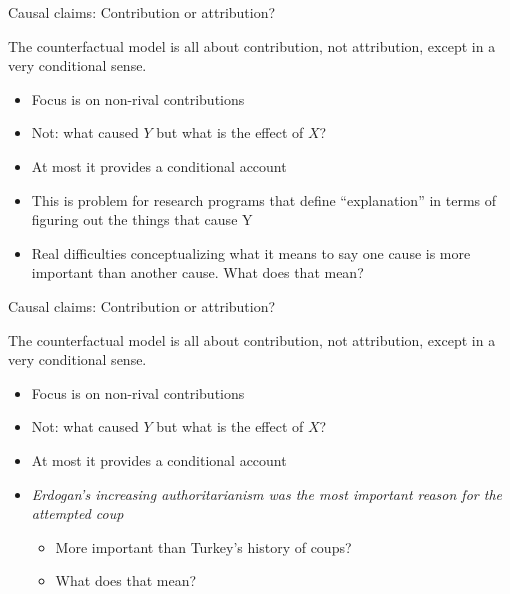 \documentclass[11pt,ignorenonframetext,]{beamer}
\providecommand{\tightlist}{%
  \setlength{\itemsep}{0pt}\setlength{\parskip}{0pt}}
\begin{document}
\begin{frame}{Causal claims: Contribution or attribution?}

The counterfactual model is all about contribution, not attribution,
except in a very conditional sense.

\begin{itemize}
\item
  Focus is on non-rival contributions
\item
  Not: what caused \(Y\) but what is the effect of \(X\)?
\item
  At most it provides a conditional account
\item
  This is problem for research programs that define ``explanation'' in
  terms of figuring out the things that cause Y
\item
  Real difficulties conceptualizing what it means to say one cause is
  more important than another cause. What does that mean?
\end{itemize}

\end{frame}

\begin{frame}{Causal claims: Contribution or attribution?}

The counterfactual model is all about contribution, not attribution,
except in a very conditional sense.

\begin{itemize}
\item
  Focus is on non-rival contributions
\item
  Not: what caused \(Y\) but what is the effect of \(X\)?
\item
  At most it provides a conditional account
\item
  \emph{Erdogan's increasing authoritarianism was the most important
  reason for the attempted coup}

  \begin{itemize}
  \tightlist
  \item
    More important than Turkey's history of coups?
  \item
    What does that mean?
  \end{itemize}
\end{itemize}

\end{frame}
\end{document}
